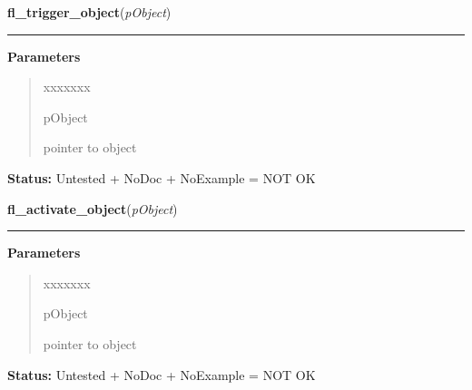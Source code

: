\hspace{.8\funcindent}\begin{boxedminipage}{\funcwidth}

    \raggedright \textbf{fl\_trigger\_object}(\textit{pObject})

    \vspace{-1.5ex}

    \rule{\textwidth}{0.5\fboxrule}
\setlength{\parskip}{2ex}
\setlength{\parskip}{1ex}
      \textbf{Parameters}
      \vspace{-1ex}

      \begin{quote}
        \begin{Ventry}{xxxxxxx}

          \item[pObject]

          pointer to object

        \end{Ventry}

      \end{quote}

\textbf{Status:} Untested + NoDoc + NoExample = NOT OK



    \end{boxedminipage}

    \label{xformslib:library:fl_activate_object}

    \vspace{0.5ex}

\hspace{.8\funcindent}\begin{boxedminipage}{\funcwidth}

    \raggedright \textbf{fl\_activate\_object}(\textit{pObject})

    \vspace{-1.5ex}

    \rule{\textwidth}{0.5\fboxrule}
\setlength{\parskip}{2ex}
\setlength{\parskip}{1ex}
      \textbf{Parameters}
      \vspace{-1ex}

      \begin{quote}
        \begin{Ventry}{xxxxxxx}

          \item[pObject]

          pointer to object

        \end{Ventry}

      \end{quote}

\textbf{Status:} Untested + NoDoc + NoExample = NOT OK



    \end{boxedminipage}

